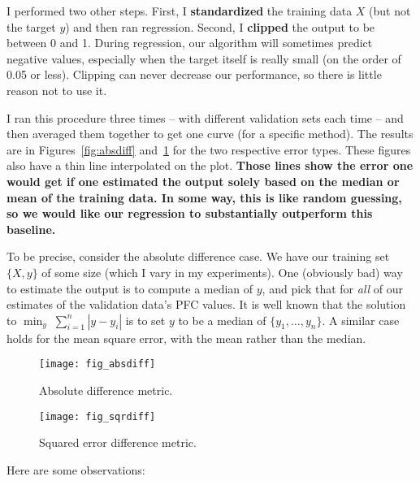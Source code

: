\documentclass[a4paper, 11pt]{article}
\begin{document}
I performed two other steps. First, I \textbf{standardized} the training data $X$ (but not the
target $y$) and then ran regression. Second, I \textbf{clipped} the output to be between 0 and 1.
During regression, our algorithm will sometimes predict negative values, especially when the target
itself is really small (on the order of 0.05 or less). Clipping can never decrease our performance,
so there is little reason not to use it.

I ran this procedure three times -- with different validation sets each time -- and then averaged
them together to get one curve (for a specific method).  The results are in
Figures~\ref{fig:absdiff} and~\ref{fig:sqrdiff} for the two respective error types. These figures
also have a thin line interpolated on the plot. \textbf{Those lines show the error one would get if
one estimated the output solely based on the median or mean of the training data. In some way, this
is like random guessing, so we would like our regression to substantially outperform this baseline.}

To be precise, consider the absolute difference case. We have our training set $\{X,y\}$ of some
size (which I vary in my experiments). One (obviously bad) way to estimate the output is to compute
a median of $y$, and pick that for \emph{all} of our estimates of the validation data's PFC values.
It is well known that the solution to $\min_y \; \sum_{i=1}^n |y - y_i|$ is to set $y$ to be a
median of $\{y_1, \ldots, y_n\}$. A similar case holds for the mean square error, with the mean
rather than the median.

\begin{figure}[t]
  \centering
  \begin{minipage}{.48\textwidth}
    \centering
    \texttt{[image: fig\_absdiff]}
    \caption{Absolute difference metric.}
    \label{fig:absdiff}
  \end{minipage}\hfill
    \begin{minipage}{.48\textwidth}
    \centering
    \texttt{[image: fig\_sqrdiff]}
    \caption{Squared error difference metric.}
    \label{fig:sqrdiff}
  \end{minipage}
\end{figure}

Here are some observations:
\end{document}
